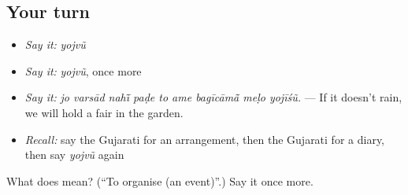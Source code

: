 \subsection*{Your turn}
\begin{itemize}
\raggedright
  \item \emph{Say it:} \emph{yojvũ}
  \item \emph{Say it:} \emph{yojvũ}, once more
  \item \emph{Say it:} \emph{jo varsād nahī̃ paḍe to ame bagīcāmā̃ meḷo yojīśũ.} — If it doesn't rain, we will hold a fair in the garden.
  \item \emph{Recall:} say the Gujarati for an arrangement, then the Gujarati for a diary, then say \emph{yojvũ} again
\end{itemize}

\begin{tcolorbox}[breakable,colback=teal!4,colframe=teal!35!black,title={Before you move on}]
What does  mean? (\textquotedblleft{}To organise (an event)\textquotedblright{}.) Say it once more.
\end{tcolorbox}
